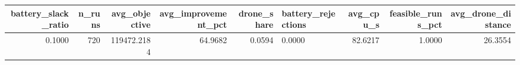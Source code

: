 \begin{tabular}{rrrrrlrrr}
\toprule
battery_slack_ratio & n_runs & avg_objective & avg_improvement_pct & drone_share & battery_rejections & avg_cpu_s & feasible_runs_pct & avg_drone_distance \\
\midrule
0.1000 & 720 & 119472.2184 & 64.9682 & 0.0594 & 0.0000 & 82.6217 & 1.0000 & 26.3554 \\
\bottomrule
\end{tabular}
